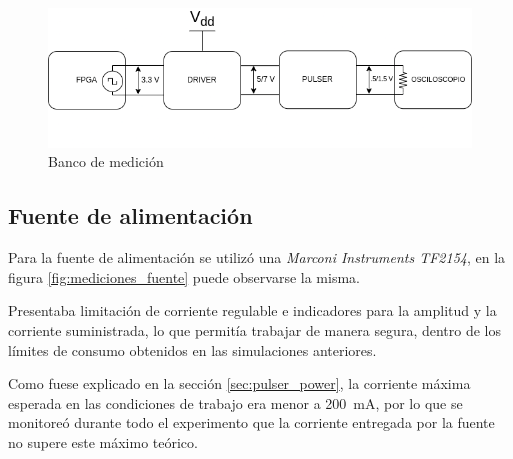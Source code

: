 \begin{figure}[t!]
  \centering
    \includegraphics[width=1\textwidth]{images/banco_medicion.drawio.png}
    \caption{Banco de medición}
    \label{fig:banco_medicion}
\end{figure}

\subsection{Fuente de alimentación}

Para la fuente de alimentación se utilizó una \textit{Marconi Instruments
TF2154}, en la figura \ref{fig:mediciones_fuente} puede observarse la misma.

Presentaba limitación de corriente regulable e indicadores para la amplitud y la
corriente suministrada, lo que permitía trabajar de manera segura, dentro de los
límites de consumo obtenidos en las simulaciones anteriores.

Como fuese explicado en la sección \ref{sec:pulser_power}, la corriente máxima
esperada en las condiciones de trabajo era menor a \qty{200}{\milli\ampere}, por
lo que se monitoreó durante todo el experimento que la corriente entregada por
la fuente no supere este máximo teórico.

